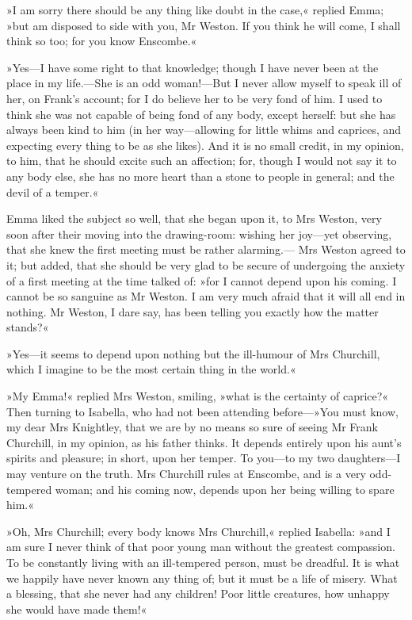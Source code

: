 »I am sorry there should be any thing like doubt in the case,« replied Emma; »but am disposed to side with you, Mr Weston. If you think he will come, I shall think so too; for you know Enscombe.«

»Yes—I have some right to that knowledge; though I have never been at the place in my life.—She is an odd woman!—But I never allow myself to speak ill of her, on Frank's account; for I do believe her to be very fond of him. I used to think she was not capable of being fond of any body, except herself: but she has always been kind to him (in her way—allowing for little whims and caprices, and expecting every thing to be as she likes). And it is no small credit, in my opinion, to him, that he should excite such an affection; for, though I would not say it to any body else, she has no more heart than a stone to people in general; and the devil of a temper.«

Emma liked the subject so well, that she began upon it, to Mrs Weston, very soon after their moving into the drawing-room: wishing her joy—yet observing, that she knew the first meeting must be rather alarming.— Mrs Weston agreed to it; but added, that she should be very glad to be secure of undergoing the anxiety of a first meeting at the time talked of: »for I cannot depend upon his coming. I cannot be so sanguine as Mr Weston. I am very much afraid that it will all end in nothing. Mr Weston, I dare say, has been telling you exactly how the matter stands?«

»Yes—it seems to depend upon nothing but the ill-humour of Mrs Churchill, which I imagine to be the most certain thing in the world.«

»My Emma!« replied Mrs Weston, smiling, »what is the certainty of caprice?« Then turning to Isabella, who had not been attending before—»You must know, my dear Mrs Knightley, that we are by no means so sure of seeing Mr Frank Churchill, in my opinion, as his father thinks. It depends entirely upon his aunt's spirits and pleasure; in short, upon her temper. To you—to my two daughters—I may venture on the truth. Mrs Churchill rules at Enscombe, and is a very odd-tempered woman; and his coming now, depends upon her being willing to spare him.«

»Oh, Mrs Churchill; every body knows Mrs Churchill,« replied Isabella: »and I am sure I never think of that poor young man without the greatest compassion. To be constantly living with an ill-tempered person, must be dreadful. It is what we happily have never known any thing of; but it must be a life of misery. What a blessing, that she never had any children! Poor little creatures, how unhappy she would have made them!«

